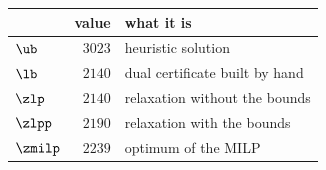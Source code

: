 \begin{center}\small
\begin{tabular}{lrl}
\toprule
 & value & what it is \\
\midrule
$\ub$ & $3023$ & heuristic solution \\
$\lb$ & $2140$ & dual certificate built by hand \\
$\zlp$ & $2140$ & relaxation without the bounds \\
$\zlpp$ & $2190$ & relaxation with the bounds \\
$\zmilp$ & $2239$ & optimum of the MILP \\
\bottomrule
\end{tabular}
\end{center}
